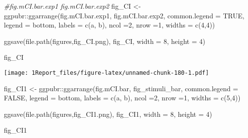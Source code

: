 \documentclass[
]{article}
\newenvironment{Shaded}{\begin{snugshade}}{\end{snugshade}}
\newcommand{\AttributeTok}[1]{\textcolor[rgb]{0.77,0.63,0.00}{#1}}
\newcommand{\CommentTok}[1]{\textcolor[rgb]{0.56,0.35,0.01}{\textit{#1}}}
\newcommand{\ConstantTok}[1]{\textcolor[rgb]{0.00,0.00,0.00}{#1}}
\newcommand{\DecValTok}[1]{\textcolor[rgb]{0.00,0.00,0.81}{#1}}
\newcommand{\FunctionTok}[1]{\textcolor[rgb]{0.00,0.00,0.00}{#1}}
\newcommand{\NormalTok}[1]{#1}
\newcommand{\OtherTok}[1]{\textcolor[rgb]{0.56,0.35,0.01}{#1}}
\newcommand{\SpecialCharTok}[1]{\textcolor[rgb]{0.00,0.00,0.00}{#1}}
\newcommand{\StringTok}[1]{\textcolor[rgb]{0.31,0.60,0.02}{#1}}
\begin{document}
\begin{Shaded}
\begin{Highlighting}[]
\CommentTok{\#fig.mCI.bar.exp1  fig.mCI.bar.exp2}
\NormalTok{fig\_CI }\OtherTok{\textless{}{-}}\NormalTok{ ggpubr}\SpecialCharTok{::}\FunctionTok{ggarrange}\NormalTok{(fig.mCI.bar.exp1, fig.mCI.bar.exp2, }\AttributeTok{common.legend =} \ConstantTok{TRUE}\NormalTok{, }\AttributeTok{legend =} \StringTok{\textquotesingle{}bottom\textquotesingle{}}\NormalTok{, }\AttributeTok{labels =} \FunctionTok{c}\NormalTok{(}\StringTok{\textquotesingle{}a\textquotesingle{}}\NormalTok{, }\StringTok{\textquotesingle{}b\textquotesingle{}}\NormalTok{), }\AttributeTok{ncol =}\DecValTok{2}\NormalTok{, }\AttributeTok{nrow =}\DecValTok{1}\NormalTok{, }\AttributeTok{widths =} \FunctionTok{c}\NormalTok{(}\DecValTok{4}\NormalTok{,}\DecValTok{4}\NormalTok{))}

\FunctionTok{ggsave}\NormalTok{(}\FunctionTok{file.path}\NormalTok{(}\StringTok{\textquotesingle{}figures\textquotesingle{}}\NormalTok{,}\StringTok{\textquotesingle{}fig\_CI.png\textquotesingle{}}\NormalTok{), fig\_CI, }\AttributeTok{width =} \DecValTok{8}\NormalTok{, }\AttributeTok{height =} \DecValTok{4}\NormalTok{)}

\NormalTok{fig\_CI}
\end{Highlighting}
\end{Shaded}

\texttt{[image: 1Report\_files/figure-latex/unnamed-chunk-180-1.pdf]}

\begin{Shaded}
\begin{Highlighting}[]
\NormalTok{fig\_CI1 }\OtherTok{\textless{}{-}}\NormalTok{ ggpubr}\SpecialCharTok{::}\FunctionTok{ggarrange}\NormalTok{(fig.mCI.bar, fig\_stimuli\_bar, }\AttributeTok{common.legend =} \ConstantTok{FALSE}\NormalTok{, }\AttributeTok{legend =} \StringTok{\textquotesingle{}bottom\textquotesingle{}}\NormalTok{, }\AttributeTok{labels =} \FunctionTok{c}\NormalTok{(}\StringTok{\textquotesingle{}a\textquotesingle{}}\NormalTok{, }\StringTok{\textquotesingle{}b\textquotesingle{}}\NormalTok{), }\AttributeTok{ncol =}\DecValTok{2}\NormalTok{, }\AttributeTok{nrow =}\DecValTok{1}\NormalTok{, }\AttributeTok{widths =} \FunctionTok{c}\NormalTok{(}\DecValTok{5}\NormalTok{,}\DecValTok{4}\NormalTok{))}

\FunctionTok{ggsave}\NormalTok{(}\FunctionTok{file.path}\NormalTok{(}\StringTok{\textquotesingle{}figures\textquotesingle{}}\NormalTok{,}\StringTok{\textquotesingle{}fig\_CI1.png\textquotesingle{}}\NormalTok{), fig\_CI1, }\AttributeTok{width =} \DecValTok{8}\NormalTok{, }\AttributeTok{height =} \DecValTok{4}\NormalTok{)}

\NormalTok{fig\_CI1}
\end{Highlighting}
\end{Shaded}
\end{document}
